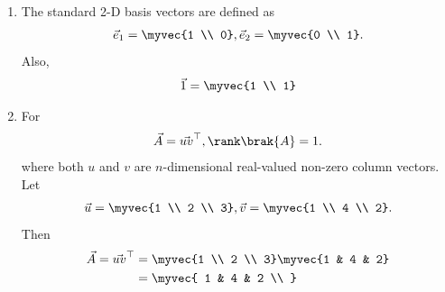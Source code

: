 \begin{enumerate}[label=\thesubsection.\arabic*, ref=\thesubsection.\theenumi]
\begin{align}
			x(t-t_0) \system{F} c_ne^{-\j 2\pi n t_0},
\label{eq:EE26BTECH11202-Fourier-shift-time}
		\end{align}
		\solution 
\begin{align}
 \int_{-\frac{1}{2f_0}}^{\frac{1}{2f_0}} x_0\brak{t-t_0} e^{-\j 2\pi n f_0 t} \, dt 
 &=
 \int_{-\frac{1}{2f_0}}^{\frac{1}{2f_0}} x_0\brak{t} e^{-\j 2\pi n f_0 \brak{t+t_0}} \, dt 
 \\
 &=
e^{\j 2\pi n f_0 t_0} \int_{-\frac{1}{2f_0}}^{\frac{1}{2f_0}} x_0\brak{t} e^{-\j 2\pi n f_0 t} \, dt 
\label{eq:EE26BTECH11202-Fourier-shift-time-1}
\end{align}
after a change of variables.  Note that the limits of integration are unchanged due the periodicity of $x(t)$.
Transferring the exponential term in \eqref{eq:EE26BTECH11202-Fourier-shift-time-1} to the L.H.S yields
\eqref{eq:EE26BTECH11202-Fourier-shift-time}.
	\item The standard 2-D basis vectors are defined as
		\begin{align}
			\vec{e}_1 = \myvec{1 \\ 0},
			\vec{e}_2 = \myvec{0 \\ 1}.
			\label{eq:EE26BTECH11202-2D-basis}
		\end{align}
		Also, 
		\begin{align}
			\vec{1} = \myvec{1 \\ 1}
			\label{eq:EE26BTECH11202-2D-one}
		\end{align}
\item For
	\begin{align}
			\label{eq:EE26BTECH11202-rank-one}
		\vec{A} = \vec{uv}^{\top}, \rank\brak{A} = 1.
\end{align}
	 where both $u$ and $v$ are $n$-dimensional real-valued non-zero column vectors. 
	 \\
	 \solution 
	 Let
\begin{align}
\vec{u} = \myvec{1 \\ 2 \\ 3}, \vec{v} = \myvec{1 \\ 4 \\ 2}.
\end{align}
Then
\begin{align}
\vec{A} = \vec{uv}^{\top} &= \myvec{1 \\ 2 \\ 3} \myvec{1 & 4 & 2} 
\\
			  &= \myvec{
1 & 4 & 2 \\
}
\end{align}
\end{enumerate}
